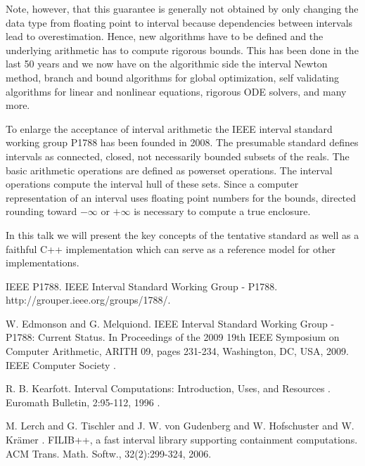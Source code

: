 \documentclass[article,A4,11pt]{llncs}%
\begin{document}
Note, however, that this guarantee is generally not obtained by only changing 
the data type from floating point to interval because dependencies between 
intervals lead to overestimation. Hence, new algorithms have to be defined and 
the underlying arithmetic has to compute rigorous bounds. 
This has been done in the last 50 years and we 
now have on the algorithmic side  
the interval Newton method, 
branch and bound algorithms for global optimization, 
self validating algorithms for linear and nonlinear equations, 
rigorous ODE solvers, 
and many more. 
 
To enlarge the acceptance of interval arithmetic the IEEE interval 
standard working group P1788 has been founded in 2008. 
The presumable 
standard  defines intervals as connected, closed, not necessarily 
 bounded subsets of the reals. 
 The basic arithmetic operations are defined as powerset 
 operations. 
 The interval operations compute the interval hull of these sets. 
Since a computer representation of an interval uses floating point numbers for 
the bounds, directed rounding toward $-\infty$ or $+\infty$ is necessary to 
compute a true enclosure. 

In this talk we will present the key concepts of the tentative standard as 
well as a faithful C++ implementation  which can serve as a reference model for 
other implementations. 


\begin{thebibliography}{10}
{\sc IEEE P1788}. {IEEE Interval Standard Working Group - P1788}. http://grouper.ieee.org/groups/1788/.

{\sc W. Edmonson and G. Melquiond}. {IEEE Interval Standard Working Group - P1788: Current Status}. In Proceedings of the 2009 19th IEEE Symposium on Computer Arithmetic, ARITH 09, pages 231-234, Washington, DC, USA, 2009. IEEE Computer Society .

{\sc R. B. Kearfott}. {Interval Computations: Introduction, Uses, and Resources }. Euromath Bulletin, 2:95-112, 1996 .

{\sc M. Lerch and G. Tischler and J. W. von Gudenberg and W. Hofschuster and W. Kr\"amer }. {FILIB++, a fast interval library supporting containment computations}. ACM Trans. Math. Softw., 32(2):299-324, 2006.
\end{thebibliography}
\end{document}
